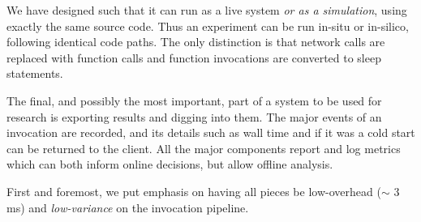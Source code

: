 We have designed \sysname{} such that it can run as a live system \emph{or as a simulation}, using exactly the same source code.
Thus an experiment can be run in-situ or in-silico, following identical code paths.
The only distinction is that network calls are replaced with function calls and function invocations are converted to sleep statements.

The final, and possibly the most important, part of a system to be used for research is exporting results and digging into them.
The major events of an invocation are recorded, and its details such as wall time and if it was a cold start can be returned to the client.
All the major components report and log metrics which can both inform online decisions, but allow offline analysis.



First and foremost, we put emphasis on having all pieces be low-overhead ($\sim$ 3 ms) and \emph{low-variance} on the invocation pipeline.


